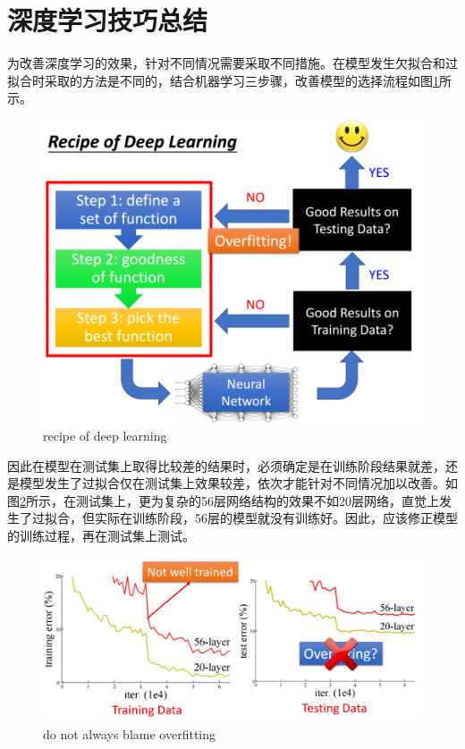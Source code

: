\section{深度学习技巧总结}

为改善深度学习的效果，针对不同情况需要采取不同措施。在模型发生欠拟合和过拟合时采取的方法是不同的，结合机器学习三步骤，改善模型的选择流程如图\ref{fig:recipe_of_dl}所示。
\begin{figure}[htb]
	\centering
	\includegraphics[scale=0.4]{pic/recipe_of_dl}
	\caption{recipe of deep learning}
	\label{fig:recipe_of_dl}
\end{figure}
因此在模型在测试集上取得比较差的结果时，必须确定是在训练阶段结果就差，还是模型发生了过拟合仅在测试集上效果较差，依次才能针对不同情况加以改善。如图\ref{fig:blame_overfitting}所示，在测试集上，更为复杂的56层网络结构的效果不如20层网络，直觉上发生了过拟合，但实际在训练阶段，56层的模型就没有训练好。因此，应该修正模型的训练过程，再在测试集上测试。
\begin{figure}[b]
	\centering
	\includegraphics[scale=0.4]{pic/blame_overfitting}
	\caption{do not always blame overfitting}
	\label{fig:blame_overfitting}
\end{figure}
